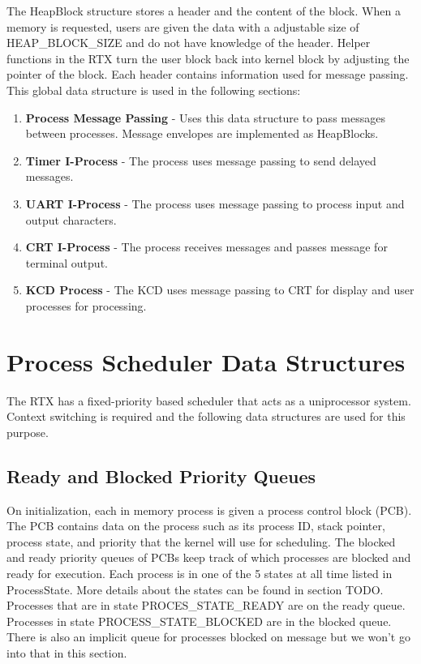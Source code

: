 \documentclass[12pt,twocolumn]{report}
\begin{document}
The HeapBlock structure stores a header and the content of the block. When a memory is requested, users are given the data with a adjustable size of HEAP\_BLOCK\_SIZE and do not have knowledge of the header. Helper functions in the RTX turn the user block back into kernel block by adjusting the pointer of the block. Each header contains information used for message passing. This global data structure is used in the following sections:
\begin{enumerate}
    \item {\bf Process Message Passing} - Uses this data structure to pass messages between processes. Message envelopes are implemented as HeapBlocks.
    \item {\bf Timer I-Process} - The process uses message passing to send delayed messages.
    \item {\bf UART I-Process} - The process uses message passing to process input and output characters.
    \item {\bf CRT I-Process} - The process receives messages and passes message for terminal output.
    \item {\bf KCD Process} - The KCD uses message passing to CRT for display and user processes for processing.
\end{enumerate}


\section{Process Scheduler Data Structures}
The RTX has a fixed-priority based scheduler that acts as a uniprocessor system. Context switching is required and the following data structures are used for this purpose.

\subsection{Ready and Blocked Priority Queues}
On initialization, each in memory process is given a process control block (PCB). The PCB contains data on the process such as its process ID, stack pointer, process state, and priority that the kernel will use for scheduling. The blocked and ready priority queues of PCBs keep track of which processes are blocked and ready for execution. Each process is in one of the 5 states at all time listed in ProcessState. More details about the states can be found in section TODO. Processes that are in state PROCES\_STATE\_READY are on the ready queue. Processes in state PROCESS\_STATE\_BLOCKED are in the blocked queue. There is also an implicit queue for processes blocked on message but we won't go into that in this section.
\end{document}
